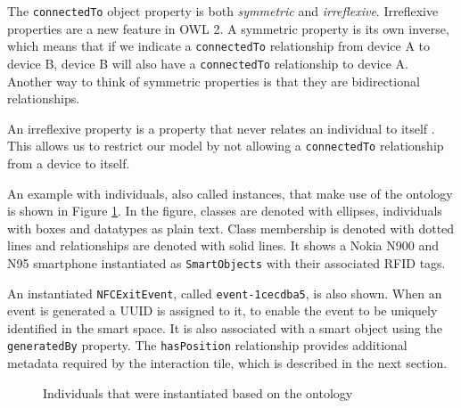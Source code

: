 The \texttt{connectedTo} object property is both \emph{symmetric} and \emph{irreflexive}. Irreflexive properties are a new feature in \ac{OWL} 2. A symmetric property is its own inverse, which means that if we indicate a \texttt{connectedTo} relationship from device A to device B, device B will also have a \texttt{connectedTo} relationship to device A. Another way to think of symmetric properties is that they are bidirectional relationships. 

An irreflexive property is a property that never relates an individual to itself \cite{Hebeler2009}. This allows us to restrict our model by not allowing a \texttt{connectedTo} relationship from a device to itself.


An example with individuals, also called instances, that make use of the ontology is shown in Figure \ref{ontologyInstance}. In the figure, classes are denoted with ellipses, individuals with boxes and datatypes as plain text. Class membership is denoted with dotted lines and relationships are denoted with solid lines. It shows a Nokia N900 and N95 smartphone instantiated as \texttt{SmartObjects} with their associated \ac{RFID} tags.

An instantiated \texttt{NFCExitEvent}, called \texttt{event-1cecdba5}, is also shown. When an event is generated a \ac{UUID} is assigned to it, to enable the event to be uniquely identified in the smart space. It is also associated with a smart object using the \texttt{generatedBy} property. The \texttt{hasPosition} relationship provides additional metadata required by the interaction tile, which is described in the next section.  

\begin{figure}[bth]
	\centerline{
	}
	\caption{Individuals that were instantiated based on the ontology}
	\label{ontologyInstance}
\end{figure}


